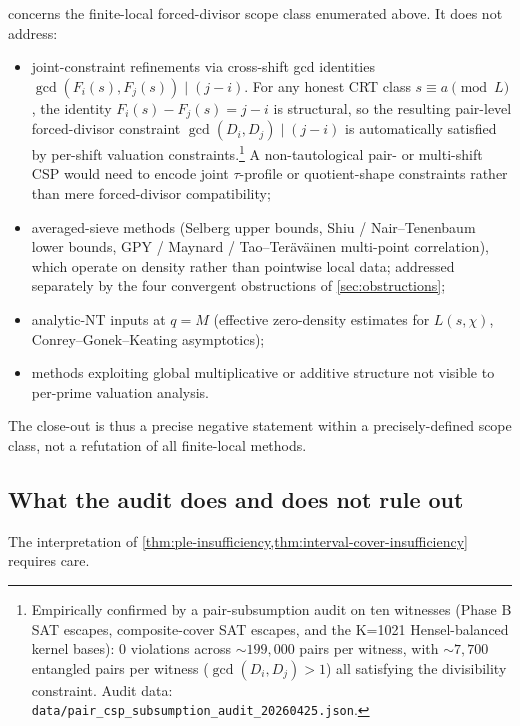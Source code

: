 \begin{remark}
\label{rem:closeout-scope}
 concerns the finite-local
forced-divisor scope class enumerated above. It does not address:
\begin{itemize}[leftmargin=*]
\item joint-constraint refinements via cross-shift gcd identities
  $\gcd(F_i(s), F_j(s)) \mid (j - i)$. For any honest CRT class
  $s \equiv a \pmod L$, the identity $F_i(s) - F_j(s) = j - i$ is
  structural, so the resulting pair-level forced-divisor constraint
  $\gcd(D_i, D_j) \mid (j - i)$ is automatically satisfied by
  per-shift valuation constraints.\footnote{Empirically confirmed
  by a pair-subsumption audit on ten witnesses (Phase B SAT
  escapes, composite-cover SAT escapes, and the K=1021
  Hensel-balanced kernel bases): $0$ violations across $\sim 199{,}000$
  pairs per witness, with $\sim 7{,}700$ entangled pairs per witness
  ($\gcd(D_i, D_j) > 1$) all satisfying the divisibility constraint.
  Audit data: \texttt{data/pair\_csp\_subsumption\_audit\_20260425.json}.}
  A non-tautological pair- or multi-shift CSP would need to encode
  joint $\tau$-profile or quotient-shape constraints rather than
  mere forced-divisor compatibility;
\item averaged-sieve methods (Selberg upper bounds,
  Shiu / Nair--Tenenbaum lower bounds, GPY / Maynard /
  Tao--Ter\"av\"ainen multi-point correlation), which operate on
  density rather than pointwise local data; addressed separately by
  the four convergent obstructions of \cref{sec:obstructions};
\item analytic-NT inputs at $q = M$ (effective zero-density
  estimates for $L(s, \chi)$, Conrey--Gonek--Keating asymptotics);
\item methods exploiting global multiplicative or additive structure
  not visible to per-prime valuation analysis.
\end{itemize}
The close-out is thus a precise negative statement within a
precisely-defined scope class, not a refutation of all finite-local
methods.
\end{remark}

\subsection{What the audit does and does not rule out}
\label{sec:audit-scope}

The interpretation of \cref{thm:ple-insufficiency,thm:interval-cover-insufficiency}
requires care.

